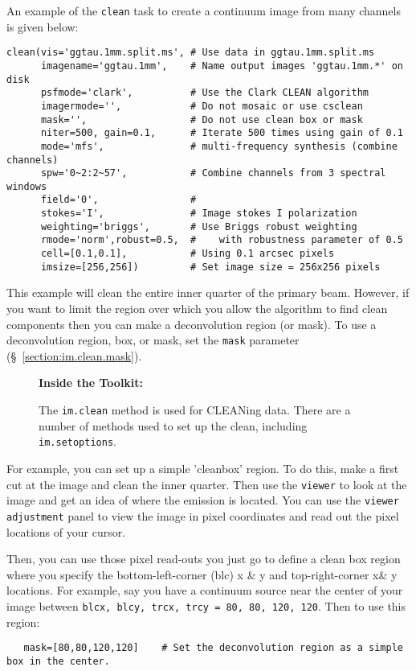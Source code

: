 An example of the {\tt clean} task to
create a continuum image from many channels is given below: 
\small
\begin{verbatim}
clean(vis='ggtau.1mm.split.ms', # Use data in ggtau.1mm.split.ms
      imagename='ggtau.1mm',    # Name output images 'ggtau.1mm.*' on disk
      psfmode='clark',          # Use the Clark CLEAN algorithm
      imagermode='',            # Do not mosaic or use csclean
      mask='',                  # Do not use clean box or mask
      niter=500, gain=0.1,      # Iterate 500 times using gain of 0.1
      mode='mfs',               # multi-frequency synthesis (combine channels)
      spw='0~2:2~57',           # Combine channels from 3 spectral windows
      field='0',                # 
      stokes='I',               # Image stokes I polarization
      weighting='briggs',       # Use Briggs robust weighting 
      rmode='norm',robust=0.5,  #    with robustness parameter of 0.5
      cell=[0.1,0.1],           # Using 0.1 arcsec pixels
      imsize=[256,256])         # Set image size = 256x256 pixels

\end{verbatim}
\normalsize

This example will clean the entire inner quarter of the primary beam.
However, if you want to limit the region over which you allow the
algorithm to find clean components then you can make a deconvolution
region (or mask).  To use a deconvolution region, box, or mask, set
the {\tt mask} parameter (\S~\ref{section:im.clean.mask}).

\begin{wrapfigure}{r}{2.5in}
  \begin{boxedminipage}{2.5in}
     \centerline{\bf Inside the Toolkit:}
     The {\tt im.clean} method is used for CLEANing data.
     There are a number of methods used to set up the clean,
     including {\tt im.setoptions}.
  \end{boxedminipage}
\end{wrapfigure}

For example, you can set up a simple 'cleanbox' region.  To do this, make
a first cut at the image and clean the inner quarter.  Then use the
{\tt viewer} to look at the image and get an idea of where the
emission is located.  You can use the {\tt viewer adjustment} panel to
view the image in pixel coordinates and read out the pixel locations
of your cursor.  

Then, you can use those pixel read-outs you just go to define a clean
box region where you specify the bottom-left-corner (blc) x \& y and
top-right-corner x\& y locations.  For example, say you have a
continuum source near the center of your image between 
{\tt blcx, blcy, trcx, trcy = 80, 80, 120, 120}.  
Then to use this region: 
\small
\begin{verbatim}
   mask=[80,80,120,120]    # Set the deconvolution region as a simple box in the center. 
\end{verbatim}
\normalsize

